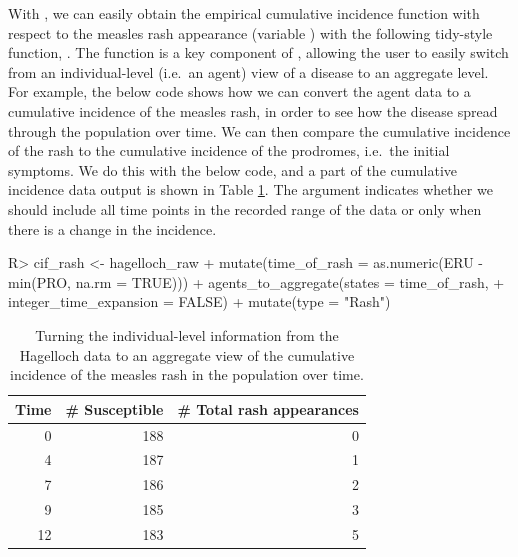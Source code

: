 \documentclass[
  shortnames]{jss}
\begin{document}
With , we can easily obtain the empirical cumulative
incidence function with respect to the measles rash appearance (variable
) with the following tidy-style function,
. The function 
is a key component of , allowing the user to easily
switch from an individual-level (i.e.~an agent) view of a disease to an
aggregate level. For example, the below code shows how we can convert
the agent data to a cumulative incidence of the measles rash, in order
to see how the disease spread through the population over time. We can
then compare the cumulative incidence of the rash to the cumulative
incidence of the prodromes, i.e.~the initial symptoms. We do this with
the below code, and a part of the cumulative incidence data output is
shown in Table \ref{tab:cif-rash}. The argument
 indicates whether we should include all
time points in the recorded range of the data or only when there is a
change in the incidence.

\begin{CodeChunk}
\begin{CodeInput}
R> cif_rash  <- hagelloch_raw %
+   mutate(time_of_rash = as.numeric(ERU - min(PRO, na.rm = TRUE))) %
+   agents_to_aggregate(states = time_of_rash,
+                       integer_time_expansion = FALSE) %
+   mutate(type = "Rash")
\end{CodeInput}
\end{CodeChunk}

\begin{CodeChunk}
\begin{table}[!h]

\caption{\label{tab:cif-rash}Turning the individual-level information from the Hagelloch data to an aggregate view of the cumulative incidence of the measles rash in the population over time.}
\centering
\begin{tabular}[t]{rrr}
\toprule
Time & \# Susceptible & \# Total rash appearances\\
\midrule
0 & 188 & 0\\
4 & 187 & 1\\
7 & 186 & 2\\
9 & 185 & 3\\
12 & 183 & 5\\
\bottomrule
\end{tabular}
\end{table}

\end{CodeChunk}
\end{document}
